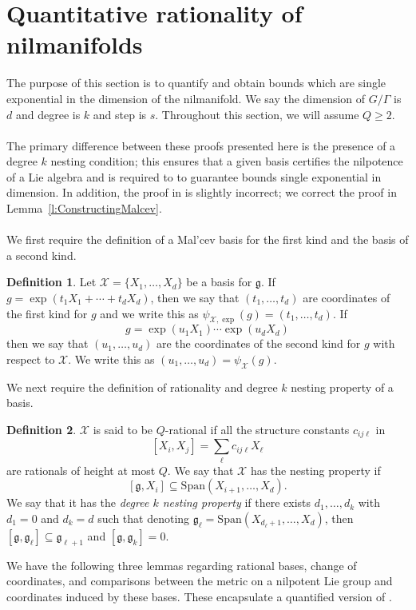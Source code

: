 \documentclass[11pt, a4paper]{amsart}
\theoremstyle{plain}
\theoremstyle{plain}
\theoremstyle{definition}
\newtheorem{definition}{Definition}
\theoremstyle{remark}
\numberwithin{equation}{section}
\numberwithin{lemma}{section}
\numberwithin{proposition}{section}
\numberwithin{corollary}{section}
\numberwithin{definition}{section}
\numberwithin{claim}{section}
\begin{document}
\section{Quantitative rationality of nilmanifolds}\label{s:quantnil}
The purpose of this section is to quantify \cite[Appendix A]{GT12} and obtain bounds which are single exponential in the dimension of the nilmanifold. We say the dimension of $G/\Gamma$ is $d$ and degree is $k$ and step is $s$. Throughout this section, we will assume $Q \ge 2$. \\\\
The primary difference between these proofs presented here is the presence of a degree $k$ nesting condition; this ensures that a given basis certifies the nilpotence of a Lie algebra and is required to to guarantee bounds single exponential in dimension. In addition, the proof in \cite[Proposition A.9]{GT12} is slightly incorrect; we correct the proof in Lemma~\ref{l:ConstructingMalcev}. \\\\
We first require the definition of a Mal'cev basis for the first kind and the basis of a second kind.
\begin{definition}
Let $\mathcal{X} = \{X_1, \dots, X_d\}$ be a basis for $\mathfrak{g}$. If $g = \exp(t_1X_1 + \cdots + t_d X_d)$, then we say that $(t_1, \dots, t_d)$ are coordinates of the first kind for $g$ and we write this as $\psi_{\mathcal{X}, \exp}(g) = (t_1, \dots, t_d)$. If 
$$g = \exp(u_1X_1) \cdots \exp(u_d X_d)$$
then we say that $(u_1, \dots, u_d)$ are the coordinates of the second kind for $g$ with respect to $\mathcal{X}$. We write this as $(u_1, \dots, u_d) = \psi_{\mathcal{X}}(g)$.
\end{definition}
We next require the definition of rationality and degree $k$ nesting property of a basis.
\begin{definition}
$\mathcal{X}$ is said to be $Q$-rational if all the structure constants $c_{ij\ell}$ in
$$[X_i, X_j] = \sum_\ell c_{ij\ell} X_\ell$$
are rationals of height at most $Q$. We say that $\mathcal{X}$ has the nesting property if
$$[\mathfrak{g}, X_i] \subseteq \text{Span}(X_{i + 1}, \dots, X_d).$$
We say that it has the \emph{degree $k$ nesting property} if there exists $d_1, \dots, d_k$ with $d_1 = 0$ and $d_k = d$ such that denoting $\mathfrak{g}_\ell = \text{Span}(X_{d_\ell + 1}, \dots, X_{d})$, then $[\mathfrak{g}, \mathfrak{g}_\ell] \subseteq \mathfrak{g}_{\ell + 1}$ and $[\mathfrak{g}, \mathfrak{g}_k] = 0$.
\end{definition}
We have the following three lemmas regarding rational bases, change of coordinates, and comparisons between the metric on a nilpotent Lie group and coordinates induced by these bases. These encapsulate a quantified version of \cite[Lemma A.2--A.4]{GT12}.
\end{document}
